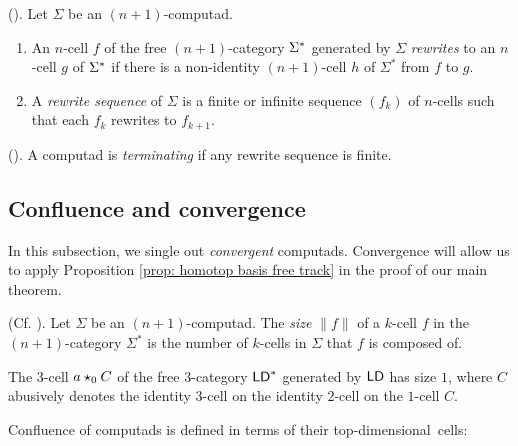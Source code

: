 \documentclass[reqno,12pt]{amsart}
\begin{document}
\begin{definition}\label{def:termination}(\cite[\S 4.1.1]{GuMa}). Let $\Sigma$ be an $(n+1)$-computad.
	\begin{enumerate}[label=(\roman*)]
	\item An $n$-cell \(f\) of the free $(n+1)$-category \(\Sigma^{\ast}\) generated by $\Sigma$ \emph{rewrites} to an $n$-cell \(g\) of \(\Sigma^{\ast}\) if there is a non-identity $(n+1)$-cell \(h\) of \(\Sigma^{\ast}\) from \(f\) to \(g\).
	\item A \emph{rewrite sequence} of $\Sigma$ is a finite or infinite sequence \((f_k)\) of \(n\)-cells such that each \(f_k\) rewrites to \(f_{k+1}\).
\end{enumerate}
\end{definition}

\begin{definition} (\cite[\S 4.1.2]{GuMa}).\label{def: termination}
	A computad is \emph{terminating} if any rewrite sequence is finite.
\end{definition}

\subsection{Confluence and convergence}
In this subsection, we single out \emph{convergent} computads. Convergence will allow us to apply Proposition \ref{prop: homotop basis free track} in the proof of our main theorem.
\begin{definition}(Cf. \cite[\S 1.4.1]{GuMa}). 
	Let $\Sigma$ be an $(n+1)$-computad. The \emph{size} \(\|f\|\) of a \(k\)-cell \(f\) in the $(n+1)$-category \(\Sigma^{\ast}\) is the number of \(k\)-cells in \(\Sigma\) that \(f\) is composed of.
\end{definition}
\begin{example}
The $3$-cell $a\star_0 C$ of the free $3$-category \(\mathsf{LD}^{\ast}\) generated by $\mathsf{LD}$ has size $1$, where $C$ abusively denotes the identity $3$-cell on the identity $2$-cell on the $1$-cell $C$.
\end{example}

Confluence of computads is defined in terms of their top-dimensional~cells:
\end{document}
